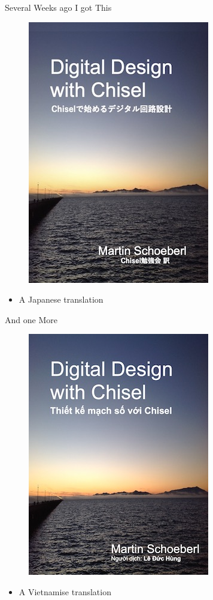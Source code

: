 \begin{frame}[fragile]{Several Weeks ago I got This}
\begin{figure}
    \centering
    \includegraphics[scale=0.4]{../cover-small-jp}
\end{figure}

\begin{itemize}
\item A Japanese translation
\end{itemize}
\end{frame}

\begin{frame}[fragile]{And one More}
\begin{figure}
    \centering
    \includegraphics[scale=0.4]{../cover-small-vi}
\end{figure}

\begin{itemize}
\item A Vietnamise translation
\end{itemize}
\end{frame}


